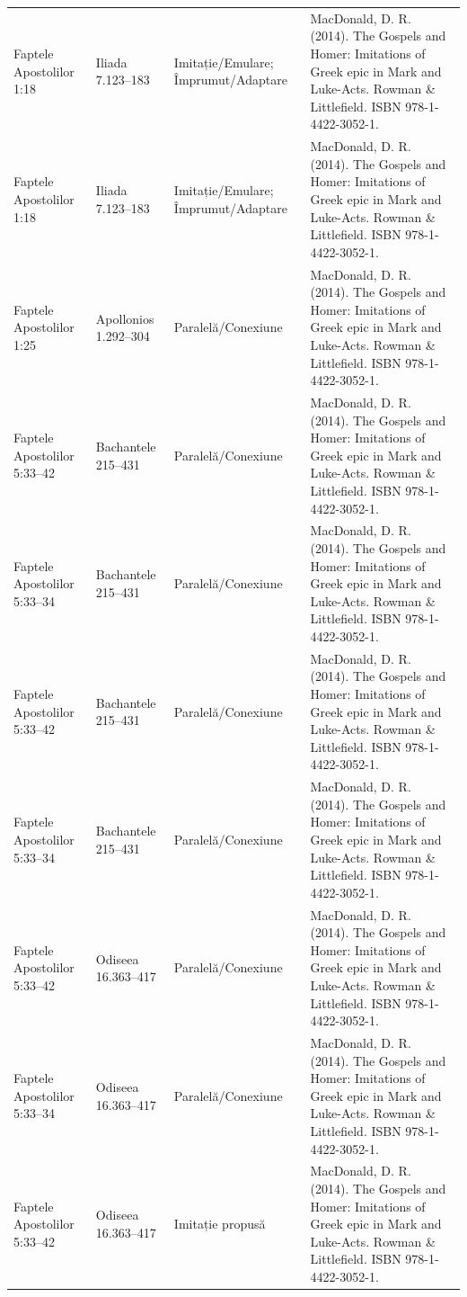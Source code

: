 \documentclass[12pt,a4paper,twoside,openany]{book}
\begin{document}
\begin{longtable}{L{1.4cm}L{1.7cm}L{3.1cm}L{8.4cm}}
Faptele Apostolilor 1:18 & Iliada 7.123–183 & Imitație/Emulare; Împrumut/Adaptare & MacDonald, D. R. (2014). The Gospels and Homer: Imitations of Greek epic in Mark and Luke-Acts. Rowman \& Littlefield. ISBN 978-1-4422-3052-1. \\
Faptele Apostolilor 1:18 & Iliada 7.123–183 & Imitație/Emulare; Împrumut/Adaptare & MacDonald, D. R. (2014). The Gospels and Homer: Imitations of Greek epic in Mark and Luke-Acts. Rowman \& Littlefield. ISBN 978-1-4422-3052-1. \\
Faptele Apostolilor 1:25 & Apollonios 1.292–304 & Paralelă/Conexiune & MacDonald, D. R. (2014). The Gospels and Homer: Imitations of Greek epic in Mark and Luke-Acts. Rowman \& Littlefield. ISBN 978-1-4422-3052-1. \\
Faptele Apostolilor 5:33–42 & Bachantele 215–431 & Paralelă/Conexiune & MacDonald, D. R. (2014). The Gospels and Homer: Imitations of Greek epic in Mark and Luke-Acts. Rowman \& Littlefield. ISBN 978-1-4422-3052-1. \\
Faptele Apostolilor 5:33–34 & Bachantele 215–431 & Paralelă/Conexiune & MacDonald, D. R. (2014). The Gospels and Homer: Imitations of Greek epic in Mark and Luke-Acts. Rowman \& Littlefield. ISBN 978-1-4422-3052-1. \\
Faptele Apostolilor 5:33–42 & Bachantele 215–431 & Paralelă/Conexiune & MacDonald, D. R. (2014). The Gospels and Homer: Imitations of Greek epic in Mark and Luke-Acts. Rowman \& Littlefield. ISBN 978-1-4422-3052-1. \\
Faptele Apostolilor 5:33–34 & Bachantele 215–431 & Paralelă/Conexiune & MacDonald, D. R. (2014). The Gospels and Homer: Imitations of Greek epic in Mark and Luke-Acts. Rowman \& Littlefield. ISBN 978-1-4422-3052-1. \\
Faptele Apostolilor 5:33–42 & Odiseea 16.363–417 & Paralelă/Conexiune & MacDonald, D. R. (2014). The Gospels and Homer: Imitations of Greek epic in Mark and Luke-Acts. Rowman \& Littlefield. ISBN 978-1-4422-3052-1. \\
Faptele Apostolilor 5:33–34 & Odiseea 16.363–417 & Paralelă/Conexiune & MacDonald, D. R. (2014). The Gospels and Homer: Imitations of Greek epic in Mark and Luke-Acts. Rowman \& Littlefield. ISBN 978-1-4422-3052-1. \\
Faptele Apostolilor 5:33–42 & Odiseea 16.363–417 & Imitație propusă & MacDonald, D. R. (2014). The Gospels and Homer: Imitations of Greek epic in Mark and Luke-Acts. Rowman \& Littlefield. ISBN 978-1-4422-3052-1. \\

\end{longtable}
\end{document}
